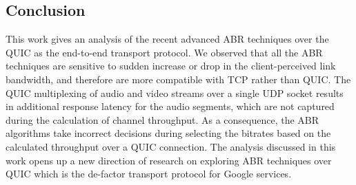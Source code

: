 \subsection{Conclusion}
This work gives an analysis of the recent advanced ABR techniques over the QUIC as the end-to-end transport protocol. We observed that all the ABR techniques are sensitive to sudden increase or drop in the client-perceived link bandwidth, and therefore are more compatible with TCP rather than QUIC. The QUIC multiplexing of audio and video streams over a single UDP socket results in additional response latency for the audio segments, which are not captured during the calculation of channel throughput. As a consequence, the ABR algorithms take incorrect decisions during selecting the bitrates based on the calculated throughput over a QUIC connection. The analysis discussed in this work opens up a new direction of research on exploring ABR techniques over QUIC which is the de-factor transport protocol for Google services. 

